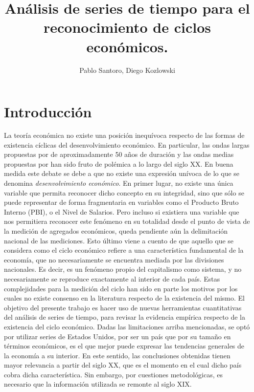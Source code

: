 \documentclass[a4paper]{article}
\title{Análisis de series de tiempo para el reconocimiento de ciclos económicos.}
\author{Pablo Santoro, Diego Kozlowski}
\begin{document}
\maketitle

\begin{abstract}
	
\end{abstract}

\section{Introducción}

La teoría económica no existe una posición inequívoca respecto de las formas de existencia cíclicas del desenvolvimiento económico. En particular, las ondas largas propuestas por \cite{kondratieff1979long} de aproximadamente 50 años de duración y las ondas medias propuestas por \cite{kuznets1930secular} han sido fruto de polémica a lo largo del siglo XX. En buena medida este debate se debe a que no existe una expresión unívoca de lo que se denomina \textit{desenvolvimiento económico}. En primer lugar, no existe una única variable que permita reconocer dicho concepto en su integridad, sino que sólo se puede representar de forma fragmentaria en variables como el Producto Bruto Interno (PBI), o el Nivel de Salarios. Pero incluso si existiera una variable que nos permitiera reconocer este fenómeno en su totalidad desde el punto de vista de la medición de agregados económicos, queda pendiente aún la delimitación nacional de las mediciones. Esto último viene a cuento de que aquello que se considera como el ciclo económico refiere a una característica fundamental de la economía, que no necesariamente se encuentra mediada por las divisiones nacionales. Es decir, es un fenómeno propio del capitalismo como sistema, y no necesariamente se reproduce exactamente al interior de cada país. Estas complejidades para la medición del ciclo han sido en parte los motivos por los cuales no existe consenso en la literatura respecto de la existencia del mismo. El objetivo del presente trabajo es hacer uso de nuevas herramientas cuantitativas del análisis de series de tiempo, para revisar la evidencia empírica respecto de la existencia del ciclo económico. Dadas las limitaciones arriba mencionadas, se optó por utilizar series de Estados Unidos, por ser un país que por su tamaño en términos económicos, es el que mejor puede expresar las tendencias generales de la economía a su interior. En este sentido, las conclusiones obtenidas tienen mayor relevancia a partir del siglo XX, que es el momento en el cual dicho país cobra dicha característica. Sin embargo, por cuestiones metodológicas, es necesario que la información utilizada se remonte al siglo XIX. 
\end{document}
